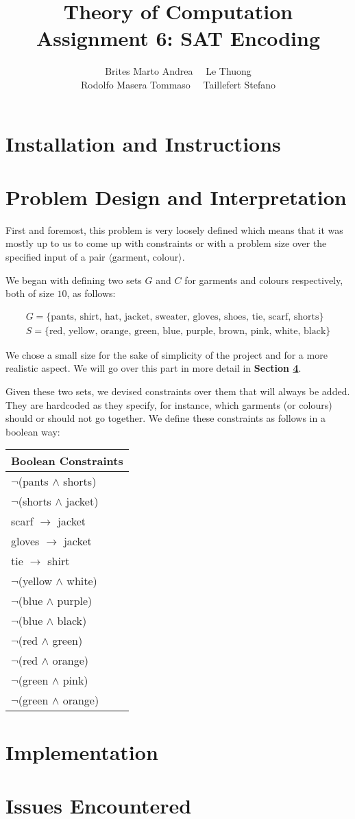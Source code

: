 \documentclass[12pt]{article}
\title{Theory of Computation \\ Assignment 6: SAT Encoding}
\author{Brites Marto Andrea \ \ Le Thuong \\ Rodolfo Masera Tommaso \ \ Taillefert Stefano}
\date{}
\newcommand{\mygather}[1]{\begin{gather*} #1 \end{gather*}}
\begin{document}
\maketitle

\section{Installation and Instructions}

\section{Problem Design and Interpretation}

First and foremost, this problem is very loosely defined which means that it was mostly up to us to come up with constraints or with a problem size over the specified input of a pair $\langle \text{garment, colour} \rangle$.

We began with defining two sets $G$ and $C$ for garments and colours respectively, both of size $10$, as follows:

\mygather{
	G = \{\text{pants, shirt, hat, jacket, sweater, gloves, shoes, tie, scarf, shorts} \} \\
	S = \{\text{red, yellow, orange, green, blue, purple, brown, pink, white, black} \}
}

We chose a small size for the sake of simplicity of the project and for a more realistic aspect. We will go over this part in more detail in \textbf{Section \ref{section:issues}}.

Given these two sets, we devised constraints over them that will always be added. They are hardcoded as they specify, for instance, which garments (or colours) should or should not go together.
We define these constraints as follows in a boolean way:

\begin{center}
\begin{tabular}{|l|}
\hline
Boolean Constraints \\
\hline
$\neg$(pants $\wedge$ shorts) \\
$\neg$(shorts $\wedge$ jacket) \\
scarf $\rightarrow$ jacket \\
gloves $\rightarrow$ jacket \\
tie $\rightarrow$ shirt \\
$\neg$(yellow $\wedge$ white) \\
$\neg$(blue $\wedge$ purple) \\
$\neg$(blue $\wedge$ black) \\
$\neg$(red $\wedge$ green) \\
$\neg$(red $\wedge$ orange) \\
$\neg$(green $\wedge$ pink) \\
$\neg$(green $\wedge$ orange) \\
\hline


\end{tabular}
\end{center}

\section{Implementation}

\section{Issues Encountered}
\label{section:issues}
\end{document}

